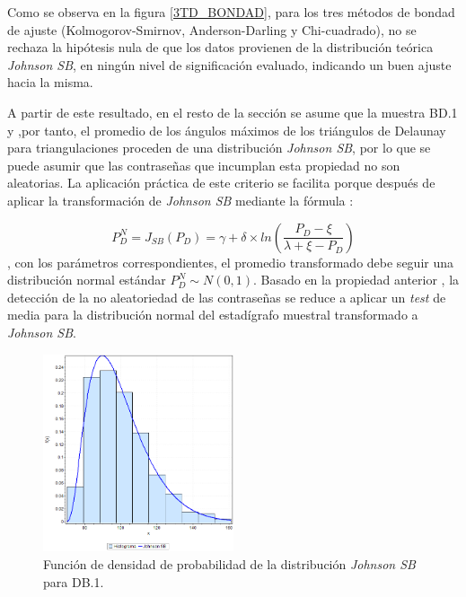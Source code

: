 \documentclass[12pt]{report}
\begin{document}
	  	
	  
	 Como se observa en la figura  \ref{3TD_BONDAD}, para los tres métodos de bondad de ajuste (Kolmogorov-Smirnov, Anderson-Darling y Chi-cuadrado), no se rechaza la hipótesis nula de que los datos provienen de la distribución teórica \textit{Johnson SB}, en ningún nivel de significación evaluado, indicando un buen ajuste hacia la misma.
	 
	 A partir de este resultado, en el resto de la sección se asume que la muestra BD.1 y ,por tanto, el promedio de los ángulos máximos de los triángulos de Delaunay para triangulaciones  proceden de una distribución \textit{Johnson SB}, por lo que se puede asumir que las contraseñas que incumplan esta propiedad no son aleatorias.
	 La aplicación práctica de este criterio se facilita porque después de  aplicar la transformación de \textit{Johnson SB}  mediante la fórmula \cite{30} :
	 
	  
	 \[
	 P_D^{N} = J_{SB}(P_D) = \gamma + \delta \times ln\left(\frac{P_D - \xi}{\lambda + \xi - P_D}\right)
	 \],
	 con los parámetros correspondientes, el promedio transformado debe seguir una distribución normal estándar $P_D^{N}\sim N(0,1)$. Basado en la propiedad anterior , la detección de la no aleatoriedad de las contraseñas se reduce a aplicar un \textit{test} de media para la distribución normal del estadígrafo muestral transformado a \textit{Johnson SB}.
	 \begin{figure}[ht]
	 	\centering
	 	
	 	\includegraphics[width=0.5\textwidth]{3td_fdp.png}
	 	\caption{Función de densidad de probabilidad de la  distribución \textit{Johnson SB} para DB.1.}
	 	\label{3TD_FDP}
	 \end{figure}
	 
	 
\end{document}
